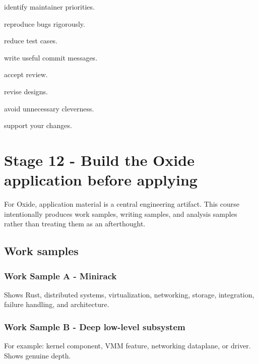 \documentclass[11pt,letterpaper]{article}
\begin{document}
\begin{topics}

\item identify maintainer priorities.

\item reproduce bugs rigorously.

\item reduce test cases.

\item write useful commit messages.

\item accept review.

\item revise designs.

\item avoid unnecessary cleverness.

\item support your changes.

\end{topics}

\section{Stage 12 - Build the Oxide application before applying}\label{sec:16}

\label{stage:12}

For Oxide, application material is a central engineering artifact. This course intentionally produces work samples, writing samples, and analysis samples rather than treating them as an afterthought.

\subsection*{Work samples}

\subsubsection*{Work Sample A - Minirack}

Shows Rust, distributed systems, virtualization, networking, storage, integration, failure handling, and architecture.

\subsubsection*{Work Sample B - Deep low-level subsystem}

For example: kernel component, VMM feature, networking dataplane, or driver. Shows genuine depth.
\end{document}
